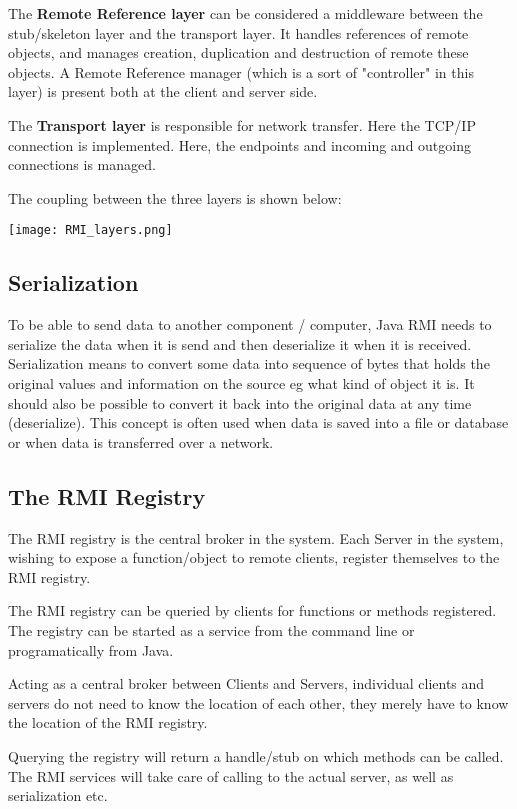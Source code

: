 The \textbf{Remote Reference layer} can be considered a middleware between the stub/skeleton layer and the transport layer. It handles references of remote objects, and manages creation, duplication and destruction of remote these objects. A Remote Reference manager (which is a sort of "controller" in this layer) is present both at the client and server side.

The \textbf{Transport layer} is responsible for network transfer. Here the TCP/IP connection is implemented. Here, the endpoints and incoming and outgoing connections is managed.

The coupling between the three layers is shown below:

\begin{center}
	\texttt{[image: RMI\_layers.png]}
\end{center}

\subsection{Serialization}
To be able to send data to another component / computer, Java RMI needs to serialize the data when it is send and then deserialize it when it is received. 
Serialization means to convert some data into sequence of bytes that holds the original values and information on the source eg what kind of object it is. It should also be possible to convert it back into the original data at any time (deserialize). This concept is often used when data is saved into a file or database or when data is transferred over a network.

\subsection{The RMI Registry}
The RMI registry is the central broker in the system. Each Server in the system, wishing to expose a function/object to remote clients, register themselves to the RMI registry.

The RMI registry can be queried by clients for functions or methods registered. The registry can be started as a service from the command line or programatically from Java. 

Acting as a central broker between Clients and Servers, individual clients and servers do not need to know the location of each other, they merely have to know the location of the RMI registry. 

Querying the registry will return a handle/stub on which methods can be called. The RMI services will take care of calling to the actual server, as well as serialization etc. 

